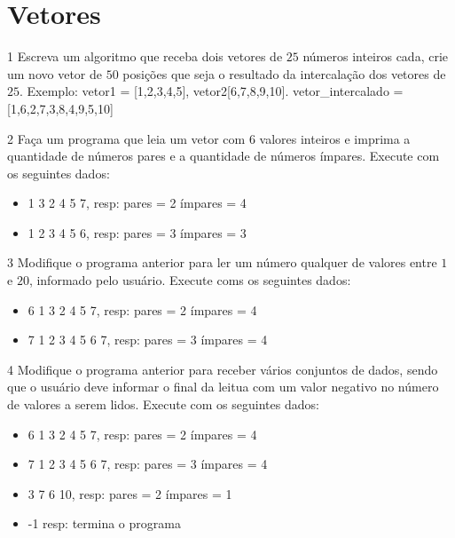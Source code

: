 \section{Vetores}
\begin{exercicio}
  {1}
  {Escreva um algoritmo que receba dois vetores de $25$ números inteiros cada, crie um novo vetor de $50$ posições que seja o resultado da intercalação dos vetores de $25$.}
  Exemplo: vetor1 = [1,2,3,4,5], vetor2[6,7,8,9,10]. vetor\_intercalado = [1,6,2,7,3,8,4,9,5,10]
\end{exercicio}

\begin{exercicio}
  {2}
  {Faça um programa que leia um vetor com $6$ valores inteiros e imprima a quantidade de números pares e a quantidade de números ímpares.}
  Execute com os seguintes dados:
  \begin{itemize}
    \item 1 3 2 4 5 7, resp: pares = 2 ímpares = 4
    \item 1 2 3 4 5 6, resp: pares = 3 ímpares = 3
  \end{itemize}
\end{exercicio}

\begin{exercicio}
  {3}
  {Modifique o programa anterior para ler um número qualquer de valores entre $1$ e $20$, informado pelo usuário.}
  Execute coms os seguintes dados:
  \begin{itemize}
    \item 6     1 3 2 4 5 7, resp: pares = 2 ímpares = 4
    \item 7     1 2 3 4 5 6 7, resp: pares = 3 ímpares = 4
  \end{itemize}
\end{exercicio}

\begin{exercicio}
  {4}
  {Modifique o programa anterior para receber vários conjuntos de dados, sendo que o usuário deve informar o final da leitua com um valor negativo no número de valores a serem lidos.}
  Execute com os seguintes dados:
  \begin{itemize}
    \item 6   1 3 2 4 5 7, resp: pares = 2 ímpares = 4
    \item 7   1 2 3 4 5 6 7, resp: pares = 3 ímpares = 4
    \item 3   7 6 10, resp: pares = 2 ímpares  = 1
    \item -1          resp: termina o programa
  \end{itemize}
\end{exercicio}


